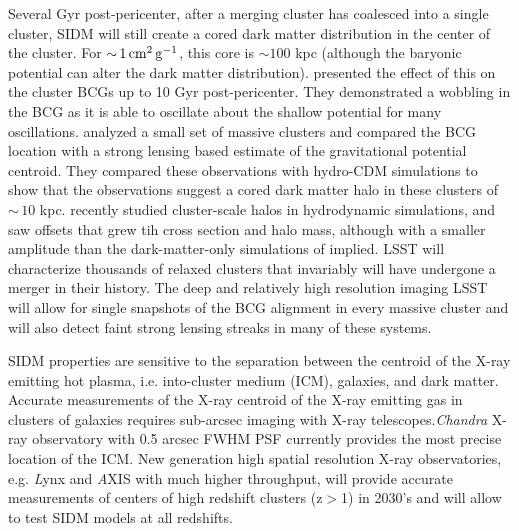 Several Gyr post-pericenter, after a merging cluster has coalesced into a single cluster, SIDM will still create a cored dark matter distribution in the center of the cluster. For $ {\sim}\, 1 \mathrm{\,cm}^{2} \mathrm{\,g}^{-1}$, this core is $\sim 100$ kpc (although the baryonic potential can alter the dark matter distribution). \citet{Kim:2016ujt} presented the effect of this on the cluster BCGs up to 10 Gyr post-pericenter. They demonstrated a wobbling in the BCG as it is able to oscillate about the shallow potential for many oscillations. \citet{1703.07365} analyzed a small set of massive clusters and compared the BCG location with a strong lensing based estimate of the gravitational potential centroid. They compared these observations with hydro-CDM simulations to show that the observations suggest a cored dark matter halo in these clusters of $\sim\,10$ kpc. \citet{Harvey:2018uwf} recently studied cluster-scale halos in hydrodynamic simulations, and saw offsets that grew tih cross section and halo mass, although with a smaller amplitude than the dark-matter-only simulations of \citet{Kim:2016ujt} implied. LSST will characterize thousands of relaxed clusters that invariably will have undergone a merger in their history. The deep and relatively high resolution imaging LSST will allow for single snapshots of the BCG alignment in every massive cluster and will also detect faint strong lensing streaks in many of these systems.

SIDM properties are sensitive to the separation between the  centroid of the X-ray emitting hot plasma, i.e. into-cluster medium (ICM), galaxies, and dark matter. Accurate measurements of the X-ray centroid of the X-ray emitting gas in clusters of galaxies requires sub-arcsec imaging with X-ray telescopes.{\it Chandra} X-ray observatory with 0.5 arcsec FWHM PSF currently provides the most precise location of the ICM. New generation high spatial resolution X-ray observatories, e.g. {\textit Lynx} and {\textit AXIS} with much higher throughput, will provide accurate measurements of centers of high redshift clusters (z$>$1) in 2030’s and will allow to test SIDM models at all redshifts.


